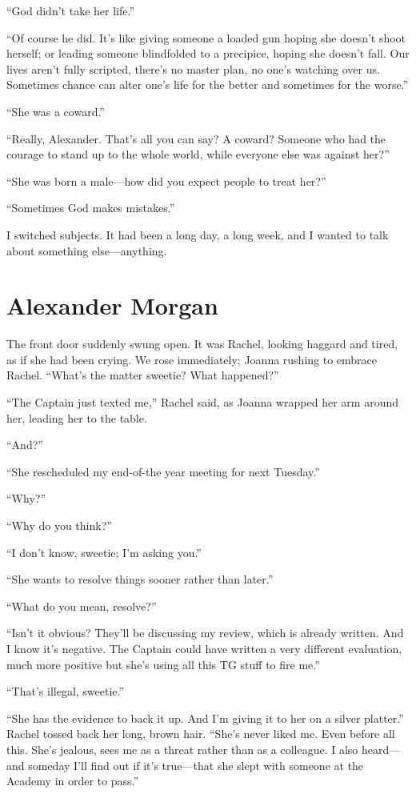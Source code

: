 ``God didn't take her life.''

``Of course he did. It's like giving someone a loaded gun hoping she
doesn't shoot herself; or leading someone blindfolded to a precipice,
hoping she doesn't fall. Our lives aren't fully scripted, there's no
master plan, no one's watching over us. Sometimes chance can alter one's
life for the better and sometimes for the worse.''

``She was a coward.''

``Really, Alexander. That's all you can say? A coward? Someone who had
the courage to stand up to the whole world, while everyone else was
against her?''

``She was born a male---how did you expect people to treat her?''

``Sometimes God makes mistakes.''

I switched subjects. It had been a long day, a long week, and I wanted
to talk about something else---anything.

\chapter{Alexander Morgan}

\titlemark

The front door suddenly swung open. It was Rachel, looking haggard and
tired, as if she had been crying. We rose immediately; Joanna rushing to
embrace Rachel. ``What's the matter sweetie? What happened?''

``The Captain just texted me,'' Rachel said, as Joanna wrapped her arm
around her, leading her to the table.

``And?''

``She rescheduled my end-of-the year meeting for next Tuesday.''

``Why?''

``Why do you think?''

``I don't know, sweetie; I'm asking you.''

``She wants to resolve things sooner rather than later.''

``What do you mean, resolve?''

``Isn't it obvious? They'll be discussing my review, which is already
written. And I know it's negative. The Captain could have written a very
different evaluation, much more positive but she's using all this TG
stuff to fire me.''

``That's illegal, sweetie.''

``She has the evidence to back it up. And I'm giving it to her on a
silver platter.'' Rachel tossed back her long, brown hair. ``She's never
liked me. Even before all this. She's jealous, sees me as a threat
rather than as a colleague. I also heard---and someday I'll find out if
it's true---that she slept with someone at the Academy in order to
pass.''


